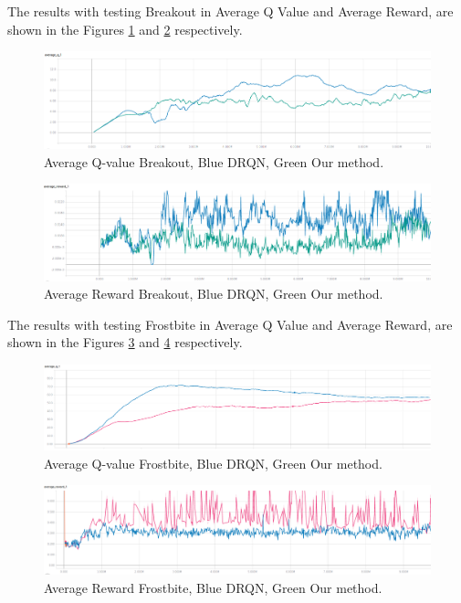 \documentclass[conference]{IEEEtran}
\begin{document}
The results with testing Breakout in Average Q Value and Average Reward, are shown in the Figures \ref{breakout-q} and \ref{breakout-r} respectively.

\begin{figure}[htbp]
\centerline{\includegraphics[width=\linewidth]{images/breakout-avQ-drqb-bl-dgruqn-gr.png}}
\caption{Average Q-value Breakout, Blue DRQN, Green Our method.}
\label{breakout-q}
\end{figure}

\begin{figure}[htbp]
\centerline{\includegraphics[width=\linewidth]{images/breakout-av-rew-drqn-bl-dgruqn-gr.png}}
\caption{Average Reward Breakout, Blue DRQN, Green Our method.}
\label{breakout-r}
\end{figure}

The results with testing Frostbite in Average Q Value and Average Reward, are shown in the Figures \ref{Frostbite-q} and \ref{Frostbite-r} respectively.


\begin{figure}[htbp]
\centerline{\includegraphics[width=\linewidth]{images/frostbite-avq-blure-drqn.png}}
\caption{Average Q-value Frostbite, Blue DRQN, Green Our method.}
\label{Frostbite-q}
\end{figure}

\begin{figure}[htbp]
\centerline{\includegraphics[width=\linewidth]{images/frostbite-av-rew-blue-dgruqn.png}}
\caption{Average Reward Frostbite, Blue DRQN, Green Our method.}
\label{Frostbite-r}
\end{figure}
\end{document}
